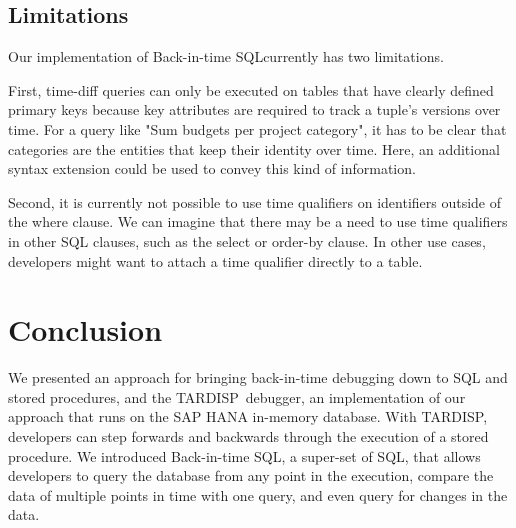 \documentclass[english,conference]{IEEEtran}
\newcommand{\tool}{TAR\-DISP}
\newcommand{\SQLextension}{Back-in-time SQL}
\begin{document}

\subsection{Limitations}

Our implementation of \SQLextension currently has two limitations.

First, time-diff queries can only be executed on tables that have clearly defined primary keys because key attributes are required to track a tuple's versions over time.
For a query like "Sum budgets per project category", it has to be clear that categories are the entities that keep their identity over time.
Here, an additional syntax extension could be used to convey this kind of information.

Second, it is currently not possible to use time qualifiers on identifiers outside of the where clause.
We can imagine that there may be a need to use time qualifiers in other SQL clauses, such as the select or order-by clause.
In other use cases, developers might want to attach a time qualifier directly to a table.


\section{Conclusion}
\label{sec:conclusion}

We presented an approach for bringing back-in-time debugging down to SQL and stored procedures, and the \tool\ debugger, an implementation of our approach that runs on the SAP HANA in-memory database.
With \tool, developers can step forwards and backwards through the execution of a stored procedure.
We introduced \SQLextension, a super-set of SQL, that allows developers to query the database from any point in the execution, compare the data of multiple points in time with one query, and even query for changes in the data.
\end{document}
